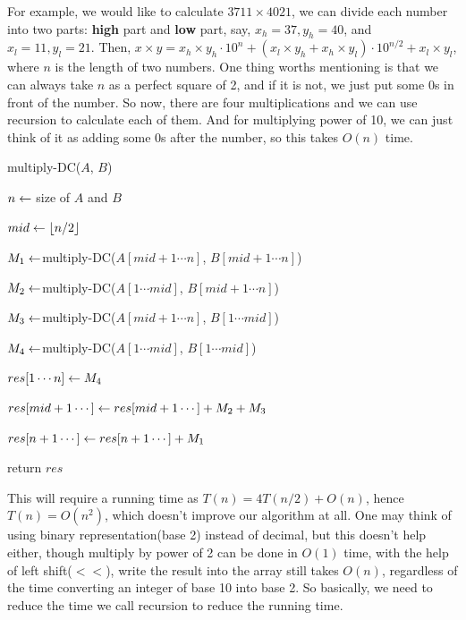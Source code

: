 \begin{spacing}{1.3}
    For example, we would like to calculate $3711\times 4021$,
    we can divide each number into two parts: {\bf high} part 
    and {\bf low} part, say, $x_h=37, y_h=40$, and $x_l=11, y_l=21$.
    Then, $x\times y=x_h\times y_h\cdot 10^n+(x_l\times y_h+x_h\times 
    y_l)\cdot 10^{n/2}+x_l\times y_l$, where $n$ is the length of 
    two numbers. One thing worths mentioning is that we can always 
    take $n$ as a perfect square of 2, and if it is not, we just 
    put some 0s in front of the number.
    So now, there are four multiplications and we can use recursion 
    to calculate each of them. And for multiplying power of 10, 
    we can just think of it as adding some 0s after the number, so 
    this takes $O(n)$ time.

    \begin{algorithm}
        \caption{multiply-DC($A$, $B$)}

        $n\leftarrow $ size of $A$ and $B$


        $mid\leftarrow \lfloor n/2 \rfloor$

        $M_1\leftarrow $multiply-DC($A[mid+1\cdots n]$, $B[mid+1\cdots n]$)
        \qquad {}

        $M_2\leftarrow $multiply-DC($A[1\cdots mid]$, $B[mid+1\cdots n]$)
        \qquad {}

        $M_3\leftarrow $multiply-DC($A[mid+1\cdots n]$, $B[1\cdots mid]$)
        \qquad {}

        $M_4\leftarrow $multiply-DC($A[1\cdots mid]$, $B[1\cdots mid]$)
        \qquad {}


        $res[1\cdots n]\leftarrow M_4$

        $res[mid+1\cdots ]\leftarrow res[mid+1\cdots] + M_2+M_3$

        $res[n+1\cdots]\leftarrow res[n+1\cdots]+M_1$

        return $res$
    \end{algorithm}

    This will require a running time as $T(n)=4T(n/2)+O(n)$, 
    hence $T(n)=O(n^2)$, which doesn't improve our algorithm 
    at all. One may think of using binary representation(base 2)
    instead of decimal, but this doesn't help either, 
    though multiply by power of 2 can be done in $O(1)$ time, 
    with the help of left shift($<<$), write the result into 
    the array still takes $O(n)$, regardless of the time 
    converting an integer of base 10 into base 2. 
    So basically, we need to reduce the time we call recursion 
    to reduce the running time.


\end{spacing}
